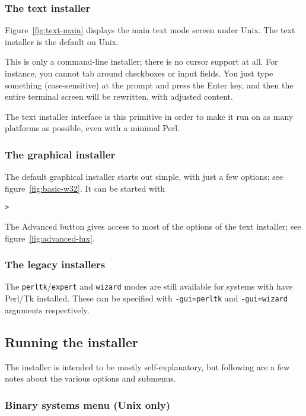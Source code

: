 \documentclass{article}
\begin{document}
\subsubsection{The text installer}

Figure~\ref{fig:text-main} displays the main text mode screen under
Unix.  The text installer is the default on Unix.

This is only a command-line installer; there is no cursor support at
all.  For instance, you cannot tab around checkboxes or input fields.
You just type something (case-sensitive) at the prompt and press the
Enter key, and then the entire terminal screen will be rewritten, with
adjusted content.

The text installer interface is this primitive in order to make it run
on as many platforms as possible, even with a minimal Perl.

\subsubsection{The graphical installer}
\label{sec:graphical-inst}

The default graphical installer starts out simple, with just a
few options; see figure~\ref{fig:basic-w32}. It can be started with
\begin{alltt}
> 
\end{alltt}
The Advanced button gives access to most of the options of the text
installer; see figure~\ref{fig:advanced-lnx}.

\subsubsection{The legacy installers}

The \texttt{perltk}/\texttt{expert} and \texttt{wizard} modes are
still available for systems with have Perl/Tk installed. These can
be specified with \texttt{-gui=perltk} and \texttt{-gui=wizard}
arguments respectively.

\subsection{Running the installer}
\label{sec:runinstall}

The installer is intended to be mostly self-explanatory, but following are a
few notes about the various options and submenus.

\subsubsection{Binary systems menu (Unix only)}
\label{sec:binary}
\end{document}
